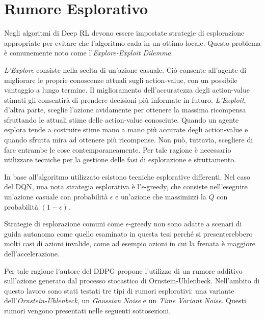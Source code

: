 \clearpage

\section{Rumore Esplorativo}

Negli algoritmi di Deep RL devono essere impostate strategie di esplorazione appropriate per evitare che l'algoritmo cada in un ottimo locale. Questo problema è comunemente noto come l'\textit{Explore-Exploit Dilemma}. 
\newline

\textit{L'Explore} consiste nella scelta di un'azione casuale. Ciò consente all'agente di migliorare le proprie conoscenze attuali sugli action-value, con un possibile vantaggio a lungo termine. 
Il miglioramento dell'accuratezza degli action-value stimati gli consentirà di prendere decisioni più informate in futuro. \textit{L'Exploit}, d'altra parte, sceglie l'azione avidamente per ottenere la massima ricompensa sfruttando le attuali stime delle action-value conosciute. 
Quando un agente esplora tende a costruire stime mano a mano più accurate degli action-value e quando sfrutta mira ad ottenere più ricompense. Non può, tuttavia, scegliere di fare entrambe le cose contemporaneamente. Per tale ragione è necessario utilizzare tecniche per la gestione delle fasi di esplorazione e sfruttamento.
\newline

In base all'algoritmo utilizzato esistono tecniche esplorative differenti. Nel caso del DQN, una nota strategia esplorativa è l'$\epsilon$-greedy, che consiste nell'eseguire un'azione casuale con probabilità $\epsilon$ e un'azione che massimizzi la $Q$ con probabilità $(1-\epsilon)$.
\newline

Strategie di esplorazione comuni come $\epsilon$-greedy non sono adatte a scenari di guida autonoma come quello esaminato in questa tesi perché si presenterebbero molti casi di azioni invalide, come ad esempio azioni in cui la frenata è maggiore dell'accelerazione.
\newline

Per tale ragione l'autore del DDPG propone l'utilizzo di un rumore additivo sull'azione generato dal processo stocastico di Ornstein-Uhlenbeck\cite{ddpgPaper}. Nell'ambito di questo lavoro sono stati testati tre tipi di rumori esplorativi: una variante dell'\textit{Ornstein-Uhlenbeck}, un \textit{Gaussian Noise} e un \textit{Time Variant Noise}. Questi rumori vengono presentati nelle seguenti sottosezioni.

